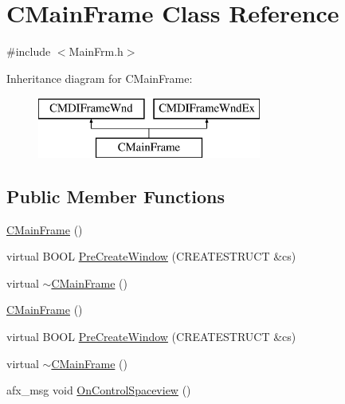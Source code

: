 \hypertarget{class_c_main_frame}{}\section{C\+Main\+Frame Class Reference}
\label{class_c_main_frame}


{\ttfamily \#include $<$Main\+Frm.\+h$>$}

Inheritance diagram for C\+Main\+Frame\+:\begin{figure}[H]
\begin{center}
\leavevmode
\includegraphics[height=2.000000cm]{class_c_main_frame}
\end{center}
\end{figure}
\subsection*{Public Member Functions}
\begin{DoxyCompactItemize}
\item 
\hyperlink{class_c_main_frame_af3e997aeae4148d2aaa4a1e1ae7bdd53}{C\+Main\+Frame} ()
\item 
virtual B\+O\+O\+L \hyperlink{class_c_main_frame_a549bf677c955c2898c3c683321633c16}{Pre\+Create\+Window} (C\+R\+E\+A\+T\+E\+S\+T\+R\+U\+C\+T \&cs)
\item 
virtual \hyperlink{class_c_main_frame_a8ae555f23fdf97edb4feb4d3e1bfa4ee}{$\sim$\+C\+Main\+Frame} ()
\item 
\hyperlink{class_c_main_frame_af3e997aeae4148d2aaa4a1e1ae7bdd53}{C\+Main\+Frame} ()
\item 
virtual B\+O\+O\+L \hyperlink{class_c_main_frame_a645bfaa1de80605bf2e9600a7502f5ba}{Pre\+Create\+Window} (C\+R\+E\+A\+T\+E\+S\+T\+R\+U\+C\+T \&cs)
\item 
virtual \hyperlink{class_c_main_frame_a0138c583d9913f04e39cd71c11b77e77}{$\sim$\+C\+Main\+Frame} ()
\item 
afx\+\_\+msg void \hyperlink{class_c_main_frame_ac35cd21df99cead8483aa72036270b94}{On\+Control\+Spaceview} ()
\end{DoxyCompactItemize}
